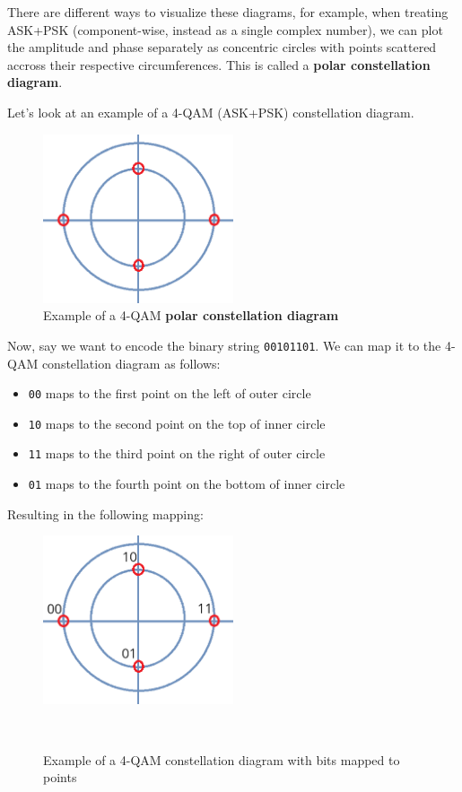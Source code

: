 There are different ways to visualize these diagrams, for example, when treating ASK+PSK (component-wise, instead as a single complex number), we can plot the amplitude and phase separately as concentric circles with points scattered accross their respective circumferences. This is called a \textbf{polar constellation diagram}.

Let's look at an example of a 4-QAM (ASK+PSK) constellation diagram.
\begin{figure}[h]
    \centering
    \includegraphics[width=0.5\textwidth]{assets/osi/physical/signals/ask+psk.png}
    \caption{Example of a 4-QAM \textbf{polar constellation diagram}}\label{fig:ask_psk_constellation}
\end{figure}

Now, say we want to encode the binary string \texttt{00101101}. We can map it to the 4-QAM constellation diagram as follows:

\begin{itemize}
    \item \texttt{00} maps to the first point on the left of outer circle
    \item \texttt{10} maps to the second point on the top of inner circle
    \item \texttt{11} maps to the third point on the right of outer circle
    \item \texttt{01} maps to the fourth point on the bottom of inner circle
\end{itemize}

Resulting in the following mapping:
\begin{figure}[h]
    \centering
    \includegraphics[width=0.5\textwidth]{assets/osi/physical/signals/ask+psk_filled.png}
    \caption{Example of a 4-QAM constellation diagram with bits mapped to points}\
    \label{fig:ask_psk_filled_constellation}
\end{figure}

